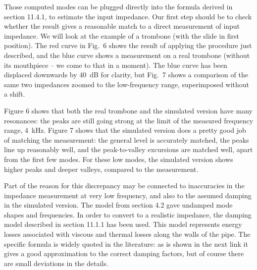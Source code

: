   Those computed modes can be plugged directly into the formula derived in 
  section 11.4.1, to estimate the input impedance. Our first step should be to 
  check whether the result gives a reasonable match to a direct measurement of 
  input impedance. We will look at the example of a trombone (with the slide in 
  first position). The red curve in Fig.\ 6 shows the result of applying the 
  procedure just described, and the blue curve shows a measurement on a real 
  trombone (without its mouthpiece -- we come to that in a moment). The blue 
  curve has been displaced downwards by 40~dB for clarity, but Fig.\ 7 shows a 
  comparison of the same two impedances zoomed to the low-frequency range, 
  superimposed without a shift. 

  Figure 6 shows that both the real trombone and the simulated version have 
  many resonances: the peaks are still going strong at the limit of the 
  measured frequency range, 4~kHz. Figure 7 shows that the simulated version 
  does a pretty good job of matching the measurement: the general level is 
  accurately matched, the peaks line up reasonably well, and the peak-to-valley 
  excursions are matched well, apart from the first few modes. For these low 
  modes, the simulated version shows higher peaks and deeper valleys, compared 
  to the measurement. 



  Part of the reason for this discrepancy may be connected to inaccuracies in 
  the impedance measurement at very low frequency, and also to the assumed 
  damping in the simulated version. The model from section 4.2 gave undamped 
  mode shapes and frequencies. In order to convert to a realistic impedance, 
  the damping model described in section 11.1.1 has been used. This model 
  represents energy losses associated with viscous and thermal losses along the 
  walls of the pipe. The specific formula is widely quoted in the literature: 
  as is shown in the next link it gives a good approximation to the correct 
  damping factors, but of course there are small deviations in the details. 

